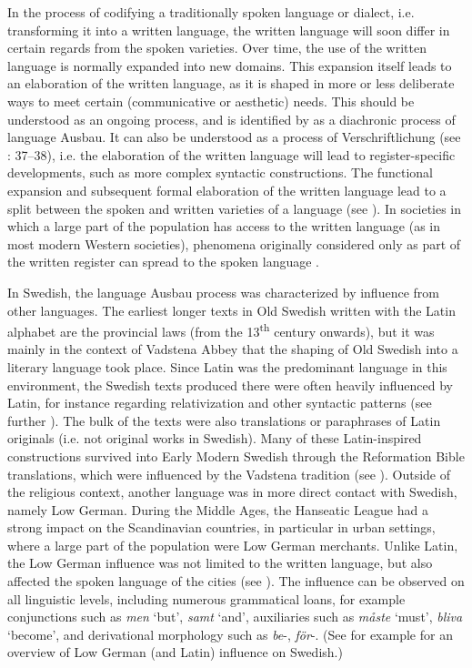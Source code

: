 \documentclass[output=paper]{langscibook}
\begin{document}
In the process of codifying a traditionally spoken language or dialect, i.e. transforming it into a written language, the written language will soon differ in certain regards from the spoken varieties. Over time, the use of the written language is normally expanded into new domains. This expansion itself leads to an elaboration of the written language, as it is shaped in more or less deliberate ways to meet certain (communicative or aesthetic) needs. This should be understood as an ongoing process, and is identified by \citet{Kloss1967} as a diachronic process of language Ausbau. It can also be understood as a process of Verschriftlichung (see \citealt{Fischer2007}: 37–38), i.e. the elaboration of the written language will lead to register-specific developments, such as more complex syntactic constructions. The functional expansion and subsequent formal elaboration of the written language lead to a split between the spoken and written varieties of a language (see \citealt{Hoder2009}). In societies in which a large part of the population has access to the written language (as in most modern Western societies), phenomena originally considered only as part of the written register can spread to the spoken language \parencites[37]{Fischer2007}[]{Weis2004}. 



In Swedish, the language Ausbau process was characterized by influence from other languages. The earliest longer texts in Old Swedish written with the Latin alphabet are the provincial laws (from the 13\textsuperscript{th} century onwards), but it was mainly in the context of Vadstena Abbey that the shaping of Old Swedish into a literary language took place. Since Latin was the predominant language in this environment, the Swedish texts produced there were often heavily influenced by Latin, for instance regarding relativization and other syntactic patterns (see further \citealt{Hoder2009, Hoder2010, Wollin1981, Wollin1983}). The bulk of the texts were also translations or paraphrases of Latin originals (i.e. not original works in Swedish). Many of these Latin-inspired constructions survived into Early Modern Swedish through the Reformation Bible translations, which were influenced by the Vadstena tradition (see \citealt{Stahle1970, Teleman2002, Teleman2003Swedish}). Outside of the religious context, another language was in more direct contact with Swedish, namely Low German. During the Middle Ages, the Hanseatic League had a strong impact on the Scandinavian countries, in particular in urban settings, where a large part of the population were Low German merchants. Unlike Latin, the Low German influence was not limited to the written language, but also affected the spoken language of the cities (see \citealt{Braunmuller1997,Braunmuller2005,}). The influence can be observed on all linguistic levels, including numerous grammatical loans, for example conjunctions such as \textit{men} ‘but’, \textit{samt} ‘and’, auxiliaries such as \textit{måste} ‘must’, \textit{bliva} ‘become’, and derivational morphology such as \textit{be}{}-, \textit{för}{}-. (See for example \citealt{Braunmuller2005} for an overview of Low German (and Latin) influence on Swedish.)
\end{document}
